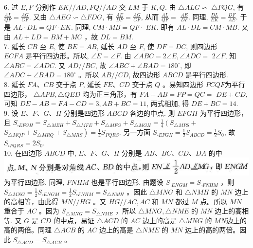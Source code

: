 \documentclass[10pt]{article}
\begin{document}
6. 过 $E, F$ 分别作 $E K / / A D, F Q / / A D$ 交 $L M$ 于 $K, Q$. 由 $\triangle A L G \backsim$ $\triangle F Q G$, 有 $\frac{A L}{Q F}=\frac{A G}{G F}$. 又由 $\triangle A E G \backsim \triangle F D G$, 有 $\frac{A E}{D F}=\frac{A G}{G F}$, 从而 $\frac{A L}{Q F}=$ $\frac{A E}{D F}$. 同理, $\frac{D L}{E K}=\frac{D F}{A E}$. 于是 $A L \cdot D L=Q F \cdot E K$. 同理, $C M \cdot M B=Q F \cdot$ $E K$. 即有 $A L \cdot D L=C M \cdot M B$. 又由 $A L+L D=B M+M C$ ，故 $D L=B M$.\\
7. 延长 $C B$ 至 $E$, 使 $B E=A B$, 延长 $A D$ 至 $F$, 使 $D F=D C$, 则四边形\\
$E C F A$ 是平行四边形。所以, $\angle E=\angle F$. 由 $\angle A B C=2 \angle E, \angle A D C=$ $2 \angle F$, 知 $\angle A B C=\angle A D C$. 又 $A D / / B C$, 故 $\angle A B C+\angle B A D=180^{\circ}$, 即 $\angle A D C+\angle B A D=180^{\circ}$ 。所以 $A B / / C D$, 故四边形 $A B C D$ 是平行四边形.\\
8. 延长 $F A 、 C B$ 交于点 $P$, 延长 $F E 、 C D$ 交于点 $Q$ 。易知四边形 $P C Q F$为平行四边形， $\triangle A P B, \triangle Q E D$ 均为正三角形，有 $F A+A B=F P=Q C=$ $D E+C D$, 可知 $D E-A B=F A-C D=3, A B+B C=11$, 两式相加, 得 $D E+B C=14$.\\
9. 设 $E 、 F 、 G 、 H$ 分别是四边形 $A B C D$ 各边的中点. 则 $E F G H$ 为平行四边形，且 $S_{\square E F G H}=S_{\triangle M E H}+S_{\triangle M F E}+S_{\triangle M F G}+S_{\triangle M G H}=\frac{1}{4}\left(S_{\triangle M P S}+\right.$ $\left.S_{\triangle M Q P}+S_{\triangle M R Q}+S_{\triangle M R S}\right)=\frac{1}{4} S_{P Q R S}$. 另一方面 $S_{\square E F G H}=\frac{1}{2} S_{A B C D}=\frac{1}{2} S_{0}$, 故 $S_{\square P Q R S}=2 S_{0}$.\\
10. 在四边形 $A B C D$ 中, $E 、 F 、 G 、 H$ 分别是 $A B 、 B C 、 C D 、 D A$ 的中\\
\includegraphics[max width=\textwidth]{2024_10_30_2c8f45efd4a519b08e1ag-176}为平行四边形. 同理, $F N H M$ 也是平行四边形. 由题设 $S_{\square E N G M}=S_{\square F N H M}$ ，则 $S_{\triangle M N G}=\frac{1}{2} S_{\square E N G M}=\frac{1}{2} S_{\square F N H M}=S_{\triangle N M H}$ 。因此 $\triangle M N G$ 和 $\triangle N M H$ 的 $M N$ 边上的高相等，由此得 $M N / / H G$ 。又 $H G / / A C, A C$ 和 $M N$ 都过 $M$ 点。所以 $M N$ 重合于 $A C$ 。因为 $S_{\triangle M N G}=S_{\triangle N M E}$ ，所以 $\triangle M N G, \triangle N M E$ 的 $M N$ 边上的高相等. 又 $G$ 是 $C D$ 的中点，易证 $\triangle A C D$ 的 $A C$ 边上的高是 $\triangle M N G$ 的 $M N$边上的高的两倍。同理 $\triangle A C B$ 的 $A C$ 边上的高是 $\triangle N M E$ 的 $M N$ 边上的高的两倍。因此 $S_{\triangle A C D}=S_{\triangle A C B}$ 。\\
\end{document}
